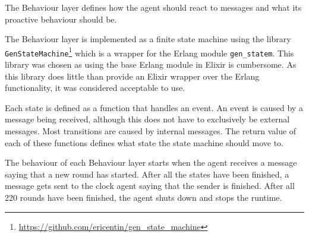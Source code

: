 The Behaviour layer defines how the agent should react to messages and what its proactive behaviour should be.

The Behaviour layer is implemented as a finite state machine using the library \verb|GenStateMachine|\footnote{\url{https://github.com/ericentin/gen_state_machine}} which is a wrapper for the Erlang module \verb|gen_statem|.
This library was chosen as using the base Erlang module in Elixir is cumbersome.
As this library does little than provide an Elixir wrapper over the Erlang functionality, it was considered acceptable to use.

Each state is defined as a function that handles an event.
An event is caused by a message being received, although this does not have to exclusively be external messages.
Most transitions are caused by internal messages.
The return value of each of these functions defines what state the state machine should move to.

The behaviour of each Behaviour layer starts when the agent receives a message saying that a new round has started.
After all the states have been finished, a message gets sent to the clock agent saying that the sender is finished.
After all 220 rounds have been finished, the agent shuts down and stops the runtime.
